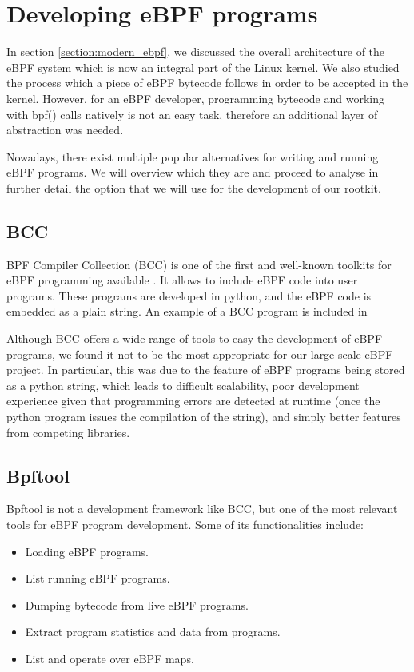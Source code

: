 \section{Developing eBPF programs}
In section \ref{section:modern_ebpf}, we discussed the overall architecture of the eBPF system which is now an integral part of the Linux kernel. We also studied the process which a piece of eBPF bytecode follows in order to be accepted in the kernel. However, for an eBPF developer, programming bytecode and working with bpf() calls natively is not an easy task, therefore an additional layer of abstraction was needed. 

Nowadays, there exist multiple popular alternatives for writing and running eBPF programs. We will overview which they are and proceed to analyse in further detail the option that we will use for the development of our rootkit.

\subsection{BCC}
BPF Compiler Collection (BCC) is one of the first and well-known toolkits for eBPF programming available \cite{bcc_github}. It allows to include eBPF code into user programs. These programs are developed in python, and the eBPF code is embedded as a plain string. An example of a BCC program is included in %

Although BCC offers a wide range of tools to easy the development of eBPF programs, we found it not to be the most appropriate for our large-scale eBPF project. In particular, this was due to the feature of eBPF programs being stored as a python string, which leads to difficult scalability, poor development experience given that programming errors are detected at runtime (once the python program issues the compilation of the string), and simply better features from competing libraries.

\subsection{Bpftool}
Bpftool is not a development framework like BCC, but one of the most relevant tools for eBPF program development. Some of its functionalities include:
\begin{itemize}
\item Loading eBPF programs.
\item List running eBPF programs.
\item Dumping bytecode from live eBPF programs.
\item Extract program statistics and data from programs.
\item List and operate over eBPF maps.
\end{itemize}

